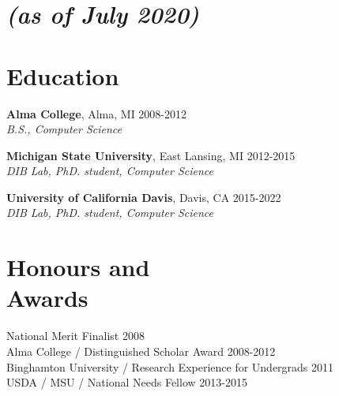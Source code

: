 \documentclass[margin,12pt]{camille_resume}
\begin{document}
\address{{\bf Permanent Address}\\
By Request\\
Davis, CA}
\address{
\hfill {\bf Contact}\\
\hfill camille.scott.w@gmail.com\\
\hfill cswel@ucdavis.edu}
\pagestyle{plain}

    
\begin{resume}



\section{\small \it{(as of July 2020)}}

    \section{\mysidestyle Education}

{\bf Alma College}, Alma, MI \hfill 2008-2012\\
{\em B.S., Computer Science}

\vspace{1mm}

{\bf Michigan State University}, East Lansing, MI \hfill 2012-2015\\
{\em DIB Lab, PhD. student, Computer Science}

\vspace{1mm}

{\bf University of California Davis}, Davis, CA \hfill 2015-2022\\
{\em DIB Lab, PhD. student, Computer Science}

\vspace{2mm}

    \section{\mysidestyle Honours and\\Awards} 

National Merit Finalist \hfill 2008\\
Alma College / Distinguished Scholar Award \hfill 2008-2012\\
Binghamton University / Research Experience for Undergrads \hfill 2011\\
USDA / MSU /  National Needs Fellow \hfill 2013-2015\\


\end{resume}
\end{document}
